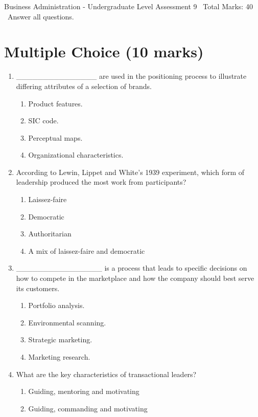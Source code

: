 \documentclass[12pt]{article}
\begin{document}
\begin{center}
Business Administration - Undergraduate Level Assessment 9 \
Total Marks: 40 \
Answer all questions.
\end{center}

\section*{Multiple Choice (10 marks)}
\begin{enumerate}[label=\arabic*.]
\item \_\_\_\_\_\_\_\_\_\_\_\_\_\_\_ are used in the positioning process to illustrate differing attributes of a selection of brands.
\begin{enumerate}[label=(\alph*)]
    \item Product features.
    \item SIC code.
    \item Perceptual maps.
    \item Organizational characteristics.
\end{enumerate}
\item According to Lewin, Lippet and White's 1939 experiment, which form of leadership produced the most work from participants?
\begin{enumerate}[label=(\alph*)]
    \item Laissez-faire
    \item Democratic
    \item Authoritarian
    \item A mix of laissez-faire and democratic
\end{enumerate}
\item \_\_\_\_\_\_\_\_\_\_\_\_\_\_\_\_ is a process that leads to specific decisions on how to compete in the marketplace and how the company should best serve its customers.
\begin{enumerate}[label=(\alph*)]
    \item Portfolio analysis.
    \item Environmental scanning.
    \item Strategic marketing.
    \item Marketing research.
\end{enumerate}
\item What are the key characteristics of transactional leaders?
\begin{enumerate}[label=(\alph*)]
    \item Guiding, mentoring and motivating
    \item Guiding, commanding and motivating

\end{enumerate}
\end{enumerate}
\end{document}
